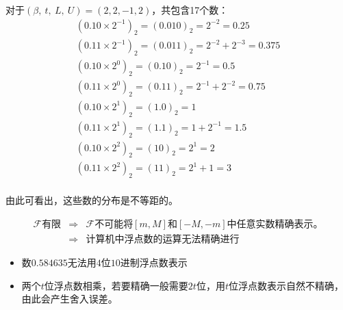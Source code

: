 \begin{frame}\ft{\secname}

对于$(\beta, ~ t, ~ L, ~U) = (2,2,-1,2)$，共包含17个数：
$$
\begin{array}{l}
(0.10\times 2^{-1})_2 = (0.010)_2 = 2^{-2} = 0.25 \\
(0.11\times 2^{-1})_2 = (0.011)_2 = 2^{-2} + 2^{-3} = 0.375\\
(0.10\times 2^{0})_2 = (0.10)_2 = 2^{-1} = 0.5\\
(0.11\times 2^{0})_2 = (0.11)_2 = 2^{-1} + 2^{-2} = 0.75\\
(0.10\times 2^{1})_2 = (1.0)_2 = 1\\
(0.11\times 2^{1})_2 = (1.1)_2 = 1 + 2^{-1} = 1.5\\
(0.10\times 2^{2})_2 = (10)_2 = 2^{1} = 2\\
(0.11\times 2^{2})_2 = (11)_2 = 2^{1} + 1 = 3\\
\end{array}
$$
\pause 
\begin{center}
\end{center}
\pause
由此可看出，这些数的分布是不等距的。

\end{frame}


\begin{frame}\ft{\secname}

$$
\begin{array}{rcl}
\mathcal{F}\mbox{有限}
&\Longrightarrow&
\mathcal{F}\mbox{不可能将}[m,M]\mbox{和}[-M,-m]\mbox{中任意实数精确表示。} \\[0.2cm]
&\Longrightarrow&
\mbox{计算机中浮点数的运算无法精确进行}
\end{array}
$$
\pause 
\begin{li}
\begin{itemize}
\item 数$0.584635$无法用$4$位$10$进制浮点数表示\pause 
\item 两个$t$位浮点数相乘，若要精确一般需要$2t$位，用$t$位浮点数表示自然不精确，由此会产生舍入误差。
\end{itemize}

\end{li}

\end{frame}


